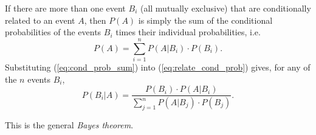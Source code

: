 	If there are more than one event $B_i$ (all mutually exclusive) that are conditionally related to an
event $A$, then $P(A)$ is simply the sum of the conditional probabilities of the events $B_i$ times their individual probabilities, i.e.
\begin{equation}
P(A) = \sum^n_{i=1} P (A|B_i) \cdot P (B_i).	 	
\label{eq:cond_prob_sum}
\end{equation}
Substituting (\ref{eq:cond_prob_sum}) into (\ref{eq:relate_cond_prob}) gives, for any of the $n$ events $B_i$,
\begin{equation}
P(B_i |A) = \frac{P (B_i) \cdot P (A|B_i)}{\displaystyle \sum ^n _{j=1} P (A|B_j)\cdot P(B_j)}.
\label{eq:Bayes_theorem}
\end{equation}

\noindent
This is the general \emph{Bayes theorem}.
